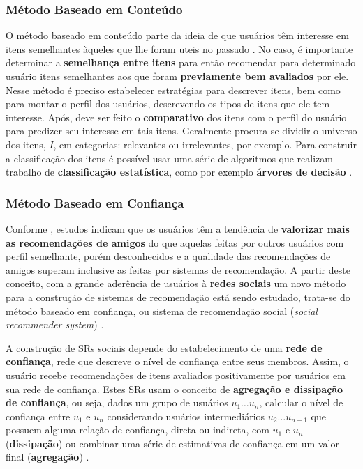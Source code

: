 \documentclass[12pt]{article}
\begin{document}
\subsubsection{Método Baseado em Conteúdo}

O método baseado em conteúdo parte da ideia de que usuários têm interesse em itens semelhantes àqueles que lhe foram uteis 
no passado \cite{ricci2011introduction}. No caso, é importante determinar a \textbf{semelhança entre itens} para então recomendar 
para determinado usuário itens semelhantes aos que foram \textbf{previamente bem avaliados} por ele. Nesse método 
é preciso estabelecer estratégias para descrever itens, bem como para montar o perfil dos usuários, descrevendo os tipos 
de itens que ele tem interesse. Após, deve ser feito o \textbf{comparativo} dos itens com o perfil do usuário para 
predizer seu interesse em tais itens. Geralmente procura-se dividir o universo dos itens, $I$, em categorias: relevantes ou 
irrelevantes, por exemplo. Para construir a classificação dos itens é possível usar uma série de algoritmos que 
realizam trabalho de \textbf{classificação estatística}, como por exemplo \textbf{árvores de decisão} \cite{pazzani2007content}. 

\subsubsection{Método Baseado em Confiança}

Conforme \cite{sinha2001comparing}, estudos indicam que os usuários têm a tendência de \textbf{valorizar mais as recomendações de amigos} do que aquelas feitas por outros usuários com perfil semelhante, porém desconhecidos e a qualidade das recomendações de amigos superam inclusive as feitas por sistemas de recomendação. A partir deste conceito, com a grande aderência de usuários 
à \textbf{redes sociais} um novo método para a construção de sistemas de recomendação está sendo estudado, trata-se do método 
baseado em confiança, ou sistema de recomendação social (\textit{social recommender system}) \cite{ricci2011introduction}.

A construção de SRs sociais depende do estabelecimento de uma \textbf{rede de confiança}, rede que descreve 
o nível de confiança entre seus membros. Assim, o usuário recebe recomendações de itens avaliados positivamente por usuários 
em sua rede de confiança. Estes SRs usam o conceito de \textbf{agregação e dissipação de confiança}, ou seja, 
dados um grupo de usuários $u_1  \dots u_n$, calcular o nível de confiança entre $u_1$ e $u_n$ considerando usuários intermediários
$u_2 \dots u_{n-1}$ que possuem alguma relação de confiança, direta ou indireta, com $u_1$ e $u_n$ (\textbf{dissipação}) ou 
combinar uma série de estimativas de confiança em um valor final (\textbf{agregação}) \cite{victor2011trust}.
\end{document}
